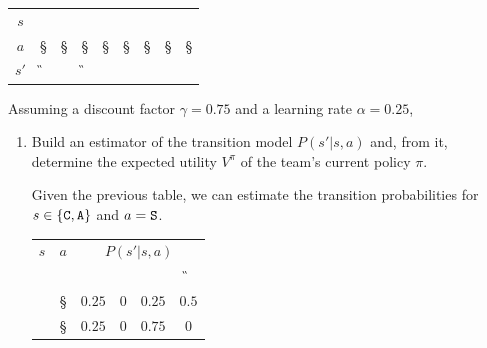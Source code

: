 \documentclass[11pt, a4paper]{article}
\begin{document}
\begin{table}[h]
    \centering
    \begin{tabular}{c|cccccccc}
        \toprule
         $s$ & \C & \C & \C & \C & \A & \A & \A & \A \\
         $a$ & \S & \S & \S & \S & \S & \S & \S & \S \\
         $s'$ & \G & \C & \G & \F & \F & \C & \F & \F \\
         \bottomrule
    \end{tabular}
\end{table}

Assuming a discount factor $\gamma = 0.75$ and a learning rate $\alpha = 0.25$,

\begin{enumerate}
    \item Build an estimator of the transition model $P(s' | s, a)$ and, from it, determine the expected utility $V^\pi$ of the team's current policy $\pi$.
    \begin{solution}
        Given the previous table, we can estimate the transition probabilities for $s \in \cbk{\C, \A}$ and $a = \S$.

        \begin{table}[h]
            \centering
            \begin{tabular}{cc|cccc}
                \toprule
                 $s$ & $a$ & \multicolumn{4}{c}{$P(s' | s, a)$} \\
                     &     & \C & \A & \F & \G \\
                 \midrule
                 \C & \S & $0.25$ & $0$ & $0.25$ & $0.5$ \\
                 \A & \S & $0.25$ & $0$ & $0.75$ & $0$ \\
                 \bottomrule
            \end{tabular}
        \end{table}


\end{solution}
\end{enumerate}
\end{document}
